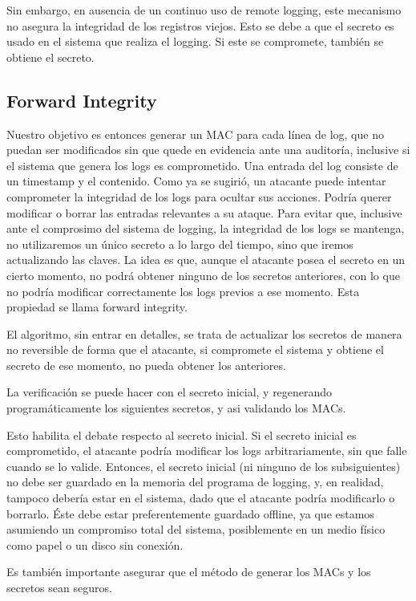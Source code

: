 Sin embargo, en ausencia de un continuo uso de remote logging, este mecanismo
no asegura la integridad de los registros viejos. Esto se debe a que el secreto es usado en el sistema que realiza el logging. 
Si este se compromete, también se obtiene el secreto.


\subsection{Forward Integrity}

Nuestro objetivo es entonces generar un MAC para cada línea de log, que no puedan
ser modificados sin que quede en evidencia ante una auditoría, inclusive si el sistema que genera
los logs es comprometido.
Una entrada del log consiste de un timestamp y el contenido. Como ya se sugirió, un atacante puede intentar comprometer la integridad de los logs para ocultar sus acciones. Podría querer modificar o borrar las entradas relevantes a su ataque.
Para evitar que, inclusive ante el comprosimo del sistema de logging, la integridad de los logs se mantenga, no utilizaremos un único secreto a lo largo del tiempo, sino que iremos actualizando las claves. La idea es que, aunque el atacante posea el secreto en un cierto momento, no podrá obtener ninguno de los secretos anteriores, con lo que no podría modificar correctamente los logs previos a ese momento. Esta propiedad se llama forward integrity.

El algoritmo, sin entrar en detalles, se trata de actualizar los secretos de manera no reversible de forma que el atacante, si compromete el sistema y obtiene el secreto de ese momento, no pueda obtener los anteriores.

La verificación se puede hacer con el secreto inicial, y regenerando programáticamente los siguientes secretos, y asi validando los MACs.

Esto habilita el debate respecto al secreto inicial. Si el secreto inicial es comprometido, el atacante podría modificar los logs arbitrariamente, sin que falle cuando se lo valide. Entonces, el secreto inicial (ni ninguno de los subsiguientes) no debe ser guardado en la memoria del programa de logging, y, en realidad, tampoco debería estar en el sistema, dado que el atacante podría modificarlo o borrarlo. Éste debe estar preferentemente guardado offline, ya que estamos asumiendo un compromiso total del sistema, posiblemente en un medio físico como papel o un disco sin conexión.

Es también importante asegurar que el método de generar los MACs y los secretos sean seguros.

